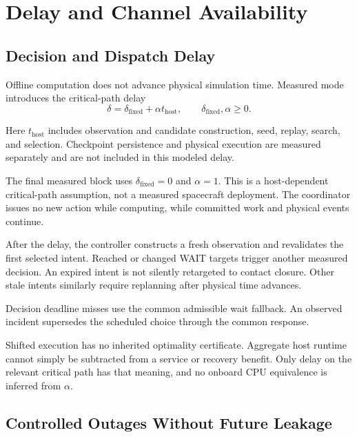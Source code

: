 \documentclass[conference]{IEEEtran}
\begin{document}
\FloatBarrier


\section{Delay and Channel Availability}
\label{sec:availability}

\subsection{Decision and Dispatch Delay}

Offline computation does not advance physical simulation time.
Measured mode introduces the critical-path delay
\begin{equation}
    \delta=
    \delta_{\mathrm{fixed}}+\alpha t_{\mathrm{host}},
    \qquad
    \delta_{\mathrm{fixed}},\alpha\geq 0.
    \label{eq:delay}
\end{equation}

Here $t_{\mathrm{host}}$ includes observation and candidate
construction, seed, replay, search, and selection.
Checkpoint persistence and physical execution are measured
separately and are not included in this modeled delay.

The final measured block uses
$\delta_{\mathrm{fixed}}=0$ and $\alpha=1$.
This is a host-dependent critical-path assumption, not a
measured spacecraft deployment.
The coordinator issues no new action while computing,
while committed work and physical events continue.

After the delay, the controller constructs a fresh observation
and revalidates the first selected intent.
Reached or changed WAIT targets trigger another measured
decision.
An expired intent is not silently retargeted to contact closure.
Other stale intents similarly require replanning after
physical time advances.

Decision deadline misses use the common admissible wait
fallback.
An observed incident supersedes the scheduled choice through
the common response.

Shifted execution has no inherited optimality certificate.
Aggregate host runtime cannot simply be subtracted from a
service or recovery benefit.
Only delay on the relevant critical path has that meaning,
and no onboard CPU equivalence is inferred from $\alpha$.

\subsection{Controlled Outages Without Future Leakage}
\end{document}
